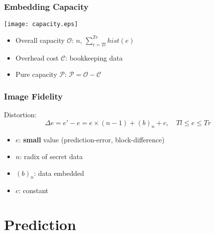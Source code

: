 \documentclass[slidestop,compress]{beamer}
\begin{document}
\begin{frame}
    \frametitle{Embedding Capacity}
    \centering
    \texttt{[image: capacity.eps]}
    \begin{itemize}
	\item Overall capacity $\mathcal{O}$: $n$, $\sum_{e = Tl}^{Tr} \mathit{hist} (e)$ \\
	\item Overhead cost $\mathcal{C}$: bookkeeping data	\\
	\item Pure capacity $\mathcal{P}$: $ \mathcal{P} = \mathcal{O} - \mathcal{C}$ \\
    \end{itemize}
\end{frame}

\begin{frame}
    \frametitle{Image Fidelity}
    Distortion:
    \begin{equation}\label{eqn:distort}
      \Delta e = e' - e = e \times (n-1) + (b)_n + c, \quad Tl \le e \le Tr
    \end{equation}
    \begin{itemize}
	\item $e$: \textbf{small} value (prediction-error, block-difference)
	\item $n$: radix of secret data
	\item $(b)_n$: data embedded
	\item $c$: constant
    \end{itemize}
\end{frame}

\section{Prediction}
\end{document}
